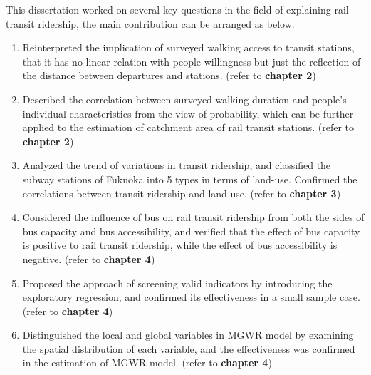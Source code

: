 This dissertation worked on several key questions in the field of explaining rail transit ridership, the main contribution can be arranged as below.

\begin{enumerate}
	\item Reinterpreted the implication of surveyed walking access to transit stations, that it has no linear relation with people willingness but just the reflection of the distance between departures and stations. (refer to \textbf{chapter 2})
	
	\item Described the correlation between surveyed walking duration and people's individual characteristics from the view of probability, which can be further applied to the estimation of catchment area of rail transit stations. (refer to \textbf{chapter 2})
	
	\item Analyzed the trend of variations in transit ridership, and classified the subway stations of Fukuoka into 5 types in terms of land-use. Confirmed the correlations between transit ridership and land-use. (refer to \textbf{chapter 3})
	
	\item Considered the influence of bus on rail transit ridership from both the sides of bus capacity and bus accessibility, and verified that the effect of bus capacity is positive to rail transit ridership, while the effect of bus accessibility is negative. (refer to \textbf{chapter 4})
	
	\item Proposed the approach of screening valid indicators by introducing the exploratory regression, and confirmed its effectiveness in a small sample case. (refer to \textbf{chapter 4})
	
	\item Distinguished the local and global variables in MGWR model by examining the spatial distribution of each variable, and the effectiveness was confirmed in the estimation of MGWR model. (refer to \textbf{chapter 4})
	

\end{enumerate}
